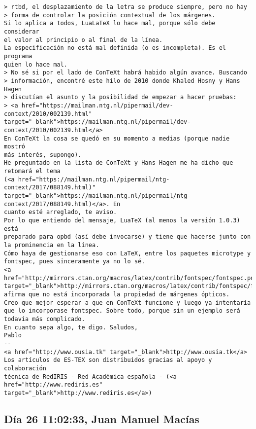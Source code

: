 \documentclass[a4paper,10pt]{article}
\begin{document}
\begin{lstlisting}
> rtbd, el desplazamiento de la letra se produce siempre, pero no hay
> forma de controlar la posición contextual de los márgenes.
Si lo aplica a todos, LuaLaTeX lo hace mal, porque sólo debe considerar
el valor al principio o al final de la línea.
La especificación no está mal definida (o es incompleta). Es el programa
quien lo hace mal.
> No sé si por el lado de ConTeXt habrá habido algún avance. Buscando
> información, encontré este hilo de 2010 donde Khaled Hosny y Hans Hagen
> discutían el asunto y la posibilidad de empezar a hacer pruebas:
> <a href="https://mailman.ntg.nl/pipermail/dev-context/2010/002139.html" target="_blank">https://mailman.ntg.nl/pipermail/dev-context/2010/002139.html</a>
En ConTeXt la cosa se quedó en su momento a medias (porque nadie mostró
más interés, supongo).
He preguntado en la lista de ConTeXt y Hans Hagen me ha dicho que
retomará el tema
(<a href="https://mailman.ntg.nl/pipermail/ntg-context/2017/088149.html)" target="_blank">https://mailman.ntg.nl/pipermail/ntg-context/2017/088149.html)</a>. En
cuanto esté arreglado, te aviso.
Por lo que entiendo del mensaje, LuaTeX (al menos la versión 1.0.3) está
preparado para opbd (así debe invocarse) y tiene que hacerse junto con
la prominencia en la línea.
Cómo haya de gestionarse eso con LaTeX, entre los paquetes microtype y
fontspec, pues sinceramente ya no lo sé.
<a href="http://mirrors.ctan.org/macros/latex/contrib/fontspec/fontspec.pdf#page=38" target="_blank">http://mirrors.ctan.org/macros/latex/contrib/fontspec/fontspec.pdf#page=38</a>
afirma que no está incorporada la propiedad de márgenes ópticos.
Creo que mejor esperar a que en ConTeXt funcione y luego ya intentaría
que lo incorporase fontspec. Sobre todo, porque sin un ejemplo será
todavía más complicado.
En cuanto sepa algo, te digo. Saludos,
Pablo
-- 
<a href="http://www.ousia.tk" target="_blank">http://www.ousia.tk</a>
Los artículos de ES-TEX son distribuidos gracias al apoyo y colaboración 
técnica de RedIRIS - Red Académica española - (<a href="http://www.rediris.es" target="_blank">http://www.rediris.es</a>)

\end{lstlisting}

\subsection{Día 26 11:02:33, Juan Manuel Macías}
\end{document}
